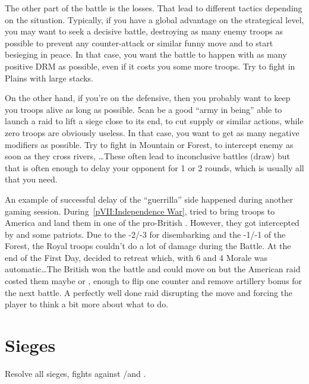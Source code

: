 \begin{playtip}[Losses]
  The other part of the battle is the losses. That lead to different tactics
  depending on the situation. Typically, if you have a global advantage on the
  strategical level, you may want to seek a decisive battle, destroying as
  many enemy troops as possible to prevent any counter-attack or similar funny
  move and to start besieging in peace. In that case, you want the battle to
  happen with as many positive DRM as possible, even if it costs you some more
  troops. Try to fight in Plains with large stacks.

  On the other hand, if you're on the defensive, then you probably want to
  keep you troops alive as long as possible. 5\LD can be a good ``army in
  being'' able to launch a raid to lift a siege close to its end, to cut
  supply or similar actions, while zero troops are obviously useless. In that
  case, you want to get as many negative modifiers as possible. Try to fight
  in Mountain or Forest, to intercept enemy as soon as they cross rivers,
  \ldots These often lead to inconclusive battles (draw) but that is often
  enough to delay your opponent for 1 or 2 rounds, which is usually all that
  you need.

  \smallskip

  An example of successful delay of the ``guerrilla'' side happened during
  another gaming session. During~\ref{pVII:Independence War}, \ANG tried to
  bring troops to America and land them in one of the pro-British
  \COL. However, they got intercepted by  and some
  patriots. Due to the -2/-3 for disembarking and the -1/-1 of the Forest, the
  Royal troops couldn't do a lot of damage during the Battle. At the end of
  the First Day,  decided to retreat which, with 6 \Man and
  4 Morale was automatic\ldots The British won the battle and could move on
  but the American raid costed them maybe \texttu or \texttd, enough to flip
  one \ARMY counter and remove artillery bonus for the next battle. A
  perfectly well done raid disrupting the \ANG move and forcing the player to
  think a bit more about what to do.
\end{playtip}

\section{Sieges}
\label{chMilitary:Sieges}
Resolve all sieges, fights against \REVOLT/\REBELLION and \corsaire.

